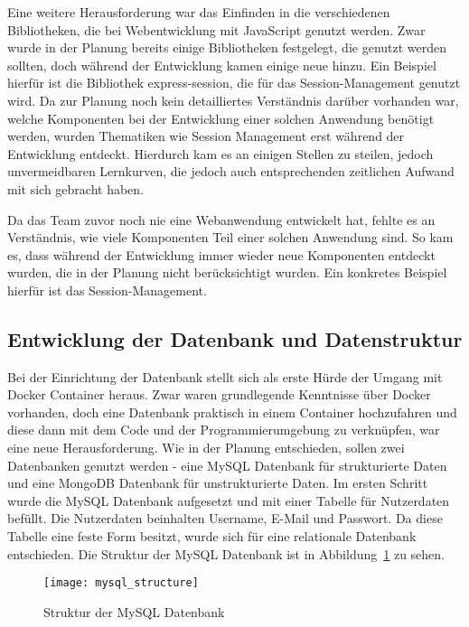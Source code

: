 Eine weitere Herausforderung war das Einfinden in die verschiedenen Bibliotheken, die bei Webentwicklung mit JavaScript genutzt werden.
Zwar wurde in der Planung bereits einige Bibliotheken festgelegt, die genutzt werden sollten, doch während der Entwicklung kamen einige neue hinzu.
Ein Beispiel hierfür ist die Bibliothek express-session, die für das Session-Management genutzt wird.
Da zur Planung noch kein detailliertes Verständnis darüber vorhanden war, welche Komponenten bei der Entwicklung einer solchen Anwendung benötigt werden, wurden Thematiken wie Session Management erst während der Entwicklung entdeckt.
Hierdurch kam es an einigen Stellen zu steilen, jedoch unvermeidbaren Lernkurven, die jedoch auch entsprechenden zeitlichen Aufwand mit sich gebracht haben.

Da das Team zuvor noch nie eine Webanwendung entwickelt hat, fehlte es an Verständnis, wie viele Komponenten Teil einer solchen Anwendung sind.
So kam es, dass während der Entwicklung immer wieder neue Komponenten entdeckt wurden, die in der Planung nicht berücksichtigt wurden.
Ein konkretes Beispiel hierfür ist das Session-Management.

\subsection{Entwicklung der Datenbank und Datenstruktur}\label{subsec:entwicklung-der-datenbank-und-datenstruktur}

Bei der Einrichtung der Datenbank stellt sich als erste Hürde der Umgang mit Docker Container heraus.
Zwar waren grundlegende Kenntnisse über Docker vorhanden, doch eine Datenbank praktisch in einem Container hochzufahren und diese dann mit dem Code und der Programmierumgebung zu verknüpfen, war eine neue Herausforderung.
Wie in der Planung entschieden, sollen zwei Datenbanken genutzt werden - eine MySQL Datenbank für strukturierte Daten und eine MongoDB Datenbank für unstrukturierte Daten.
Im ersten Schritt wurde die MySQL Datenbank aufgesetzt und mit einer Tabelle für Nutzerdaten befüllt.
Die Nutzerdaten beinhalten Username, E-Mail und Passwort.
Da diese Tabelle eine feste Form besitzt, wurde sich für eine relationale Datenbank entschieden.
Die Struktur der MySQL Datenbank ist in Abbildung~\ref{fig:mysql_structure} zu sehen.

\newpage
\begin{figure}[h]
    \centering
    \texttt{[image: mysql\_structure]}
    \caption{Struktur der MySQL Datenbank}
    \label{fig:mysql_structure}
\end{figure}


